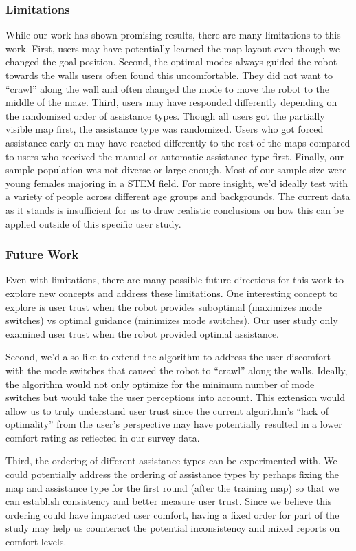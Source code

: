 \subsubsection{Limitations} 
While our work has shown promising results, there are many limitations to this work. First, users may have potentially learned the map layout even though we changed the goal position. Second, the optimal modes always guided the robot towards the walls users often found this uncomfortable. They did not want to “crawl” along the wall and often changed the mode to move the robot to the middle of the maze. Third, users may have responded differently depending on the randomized order of assistance types. Though all users got the partially visible map first, the assistance type was randomized. Users who got forced assistance early on may have reacted differently to the rest of the maps compared to users who received the manual or automatic assistance type first. Finally, our sample population was not diverse or large enough. Most of our sample size were young females majoring in a STEM field. For more insight, we’d ideally test with a variety of people across different age groups and backgrounds. The current data as it stands is insufficient for us to draw realistic conclusions on how this can be applied outside of this specific user study.

\subsubsection{Future Work}
Even with limitations, there are many possible future directions for this work to explore new concepts and address these limitations. One interesting concept to explore is user trust when the robot provides suboptimal (maximizes mode switches) vs optimal guidance (minimizes mode switches). Our user study only examined user trust when the robot provided optimal assistance. 

Second, we’d also like to extend the algorithm to address the user discomfort with the mode switches that caused the robot to “crawl” along the walls. Ideally, the algorithm would not only optimize for the minimum number of mode switches but would take the user perceptions into account. This extension would allow us to truly understand user trust since the current algorithm’s “lack of optimality” from the user’s perspective may have potentially resulted in a lower comfort rating as reflected in our survey data. 

Third, the ordering of different assistance types can be experimented with. We could potentially address the ordering of assistance types by perhaps fixing the map and assistance type for the first round (after the training map) so that we can establish consistency and better measure user trust. Since we believe this ordering could have impacted user comfort, having a fixed order for part of the study may help us counteract the potential inconsistency and mixed reports on comfort levels. 


